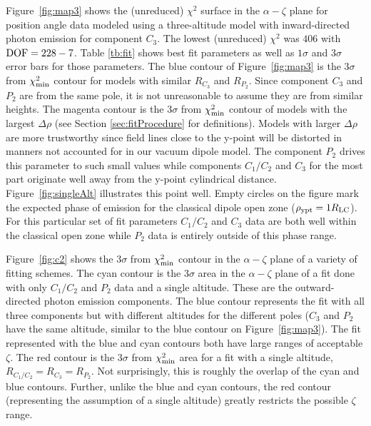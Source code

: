 Figure~\ref{fig:map3} shows the (unreduced) $\chi^2$ surface in the $\alpha-\zeta$
plane for position angle data modeled using a three-altitude
model with inward-directed photon emission for component $C_3$.  The lowest (unreduced) $\chi^2$
was $406$ with $\rm{DOF}=228-7$.  Table \ref{tb:fit} shows best fit parameters
as well as $1\sigma$ and $3\sigma$ error bars for those parameters.  The blue contour
of Figure~\ref{fig:map3} is the $3\sigma$ from $\chi^2_{\rm{min}}$ contour for models with similar 
$R_{C_3}$ and $R_{P_2}$.  Since component $C_3$ and $P_2$ are from the same pole,
it is not unreasonable to assume they are from similar heights.  The magenta
contour is the $3\sigma$ from $\chi^2_{\rm{min}}$ contour of models with the 
largest $\Delta\rho$ (see Section \ref{sec:fitProcedure} for definitions).  Models with larger $\Delta\rho$ 
are more trustworthy since field lines close to the y-point will be
distorted in manners not accounted for in our vacuum dipole model.  The
component $P_2$ drives this parameter to such small values while components $C_1/C_2$
and $C_3$ for the most part originate well away from the y-point cylindrical distance.
Figure~\ref{fig:singleAlt} illustrates this point well.
Empty circles on the figure mark the expected phase of emission for the 
classical dipole open zone ($\rho_{\rm{ypt}}=1R_{\rm{LC}}$).  For
this particular set of fit parameters $C_1/C_2$ and $C_3$
data are both well within the classical open zone while
$P_2$ data is entirely outside of this phase range.

Figure~\ref{fig:c2} shows the $3\sigma$ from $\chi^2_{\rm{min}}$ contour in the $\alpha-\zeta$
plane of a variety of fitting schemes.  The cyan contour is the $3\sigma$ area 
in the $\alpha-\zeta$ plane of a fit done with only $C_1/C_2$ and $P_2$ data and a single
altitude.  These are the outward-directed photon emission components.  The blue contour represents
the fit with all three components but with different altitudes for the 
different poles ($C_3$ and $P_2$ have the same altitude, similar to the blue
contour on Figure~\ref{fig:map3}).  The fit
represented with the blue and cyan contours both have large ranges
of acceptable $\zeta$.  The red contour is the $3\sigma$ from
$\chi^2_{\rm{min}}$ area for a fit with a single altitude, $R_{C_1/C_2}=R_{C_3}=R_{P_2}$.
Not surprisingly, this is roughly the overlap of the cyan and blue contours.
Further, unlike the blue and cyan contours, the red contour (representing the assumption
of a single altitude) greatly restricts the possible $\zeta$ range.

